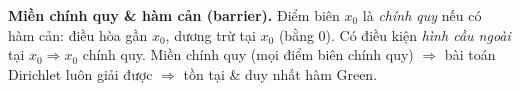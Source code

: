 \textbf{Miền chính quy \& hàm cản (barrier).}
Điểm biên $x_0$ là \emph{chính quy} nếu có hàm cản: điều hòa gần $x_0$, dương trừ tại $x_0$ (bằng 0). Có điều kiện \emph{hình cầu ngoài} tại $x_0\Rightarrow x_0$ chính quy. Miền chính quy (mọi điểm biên chính quy) $\Rightarrow$ bài toán Dirichlet luôn giải được $\Rightarrow$ tồn tại \& duy nhất hàm Green.

